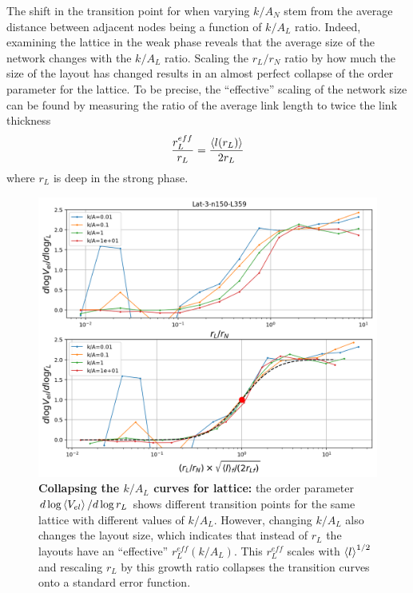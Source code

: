 \documentclass[endfloats,nofootinbib,preprint,floatfix,titlepage,superscriptaddress,linenumbers]{revtex4-1} %
\begin{document}
{%

The shift in the transition point for when varying $k/A_N$ stem from the average distance between adjacent nodes being a function of $k/A_L$ ratio.
Indeed, examining the lattice in the weak phase reveals that the average size of the network changes with the $k/A_L$ ratio. 
Scaling the $r_L/r_N$ ratio by how much the size of the layout has changed results in an almost perfect collapse of the order parameter for the lattice. 
To be precise, the ``effective'' scaling of the network size can be found by measuring the ratio of the average link length to twice the link thickness 
\[{r_L^{eff}\over r_L} = {\left<l(r_L)\right>\over 2 r_L}\]
where $r_L$ is deep in the strong phase. 
\begin{figure}
    \centering
    \includegraphics[width=.7\textwidth]{fig-09-19/Lat-kA-scaled-fit.png}
    \caption{\scriptsize {\bf Collapsing the $k/A_L$ curves for lattice:} the order parameter $d\log \left<V_{el}\right> /d \log r_L $ shows different transition points for the same lattice with different values of $k/A_L$.
    However, changing $k/A_L$ also changes the layout size, which indicates that instead of $r_L$ the layouts have an ``effective'' $r_L^{eff}(k/A_L)$.  
    This $r_L^{eff}$ scales with $\left<l\right>^{1/2}$ and rescaling $r_L$ by this growth ratio collapses the transition curves onto a standard error function.}
    \label{fig:l-kA-lat}
\end{figure}


}
\end{document}

